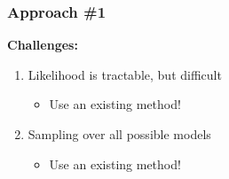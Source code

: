 \begin{frame}[t,label=challenges]
    \frametitle{Approach \#1}

    \textbf{Challenges:} \\
    \begin{minipage}[t][0.35\textheight][t]{\linewidth}
    \begin{enumerate}
        \item<1-> Likelihood is tractable, but difficult
        \begin{itemize}
            \item<2-> Use an existing method!
        \end{itemize}
    \end{enumerate}
    \end{minipage}

    \begin{minipage}[t][0.35\textheight][t]{\linewidth}
    \begin{enumerate}
        \setcounter{enumi}{1}
        \item<1-> Sampling over all possible models
        \begin{itemize}
            \item<2-> Use an existing method! 
        \end{itemize}
    \end{enumerate}
    \end{minipage}
\end{frame}
